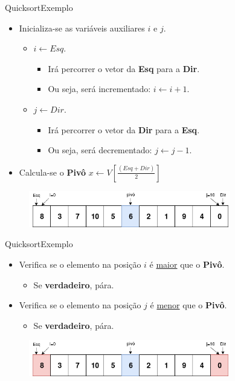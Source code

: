 \documentclass[aspectratio=169]{beamer}
\begin{document}
\begin{frame}{Quicksort}{Exemplo}
\begin{itemize}
\item Inicializa-se as variáveis auxiliares $i$ e $j$.
\begin{itemize}
 \item $i \leftarrow Esq$. 
 \begin{itemize}
 \item Irá percorrer o vetor da {\bf Esq} para a {\bf Dir}.
 \item Ou seja, será incrementado: $i\leftarrow i + 1$.
 \end{itemize}
 \item $j \leftarrow Dir$. 
 \begin{itemize}
 \item Irá percorrer o vetor da {\bf Dir} para a {\bf Esq}.
 \item Ou seja, será decrementado: $j\leftarrow j - 1$.
 \end{itemize}
\end{itemize}
\item Calcula-se o {\bf Pivô} $x\leftarrow V[ \frac{(Esq + Dir)}{2}]$
\end{itemize}

\begin{figure}[!h]
  \centering
  \includegraphics[width=250pt]{imgs/quick/quick2.png}
  \label{fig_quick2}
\end{figure}
\end{frame}


\begin{frame}{Quicksort}{Exemplo}
\begin{itemize}
 \item Verifica se o elemento na posição $i$ é \underline{maior} que o {\bf Pivô}.
 \begin{itemize}
 \item Se {\bf verdadeiro}, pára.
 \end{itemize}
 \item Verifica se o elemento na posição $j$ é \underline{menor} que o {\bf Pivô}.
 \begin{itemize}
 \item Se {\bf verdadeiro}, pára.
 \end{itemize}
\end{itemize}

\begin{figure}[!h]
  \centering
  \includegraphics[width=250pt]{imgs/quick/quick3.png}
  \label{fig_quick3}
\end{figure}
\end{frame}
\end{document}
